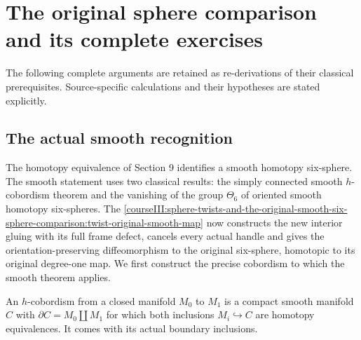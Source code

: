\section{The original sphere comparison and its complete exercises}\label{courseIII:integral-homology-and-sphere-recognition:section}

The following complete arguments are retained as re-derivations of their classical prerequisites. Source-specific calculations and their hypotheses are stated explicitly.

\subsection{The actual smooth recognition}
\label{courseIII:integral-homology-and-sphere-recognition:smooth-recognition}

\label{courseIII:integral-homology-and-sphere-recognition:section-10}

The homotopy equivalence of Section 9 identifies a smooth homotopy six-sphere. The smooth statement uses two classical results: the simply connected smooth \(h\)-cobordism theorem and the vanishing of the group \(\Theta_6\) of oriented smooth homotopy six-spheres. The \cref{courseIII:sphere-twists-and-the-original-smooth-six-sphere-comparison:twist-original-smooth-map} now constructs the new interior gluing with its full frame defect, cancels every actual handle and gives the orientation-preserving diffeomorphism to the original six-sphere, homotopic to its original degree-one map. We first construct the precise cobordism to which the smooth theorem applies.

An \(h\)-cobordism from a closed manifold \(M_0\) to \(M_1\) is a compact smooth manifold \(C\) with \(\partial C=M_0\amalg M_1\) for which both inclusions \(M_i\hookrightarrow C\) are homotopy equivalences. It comes with its actual boundary inclusions.

